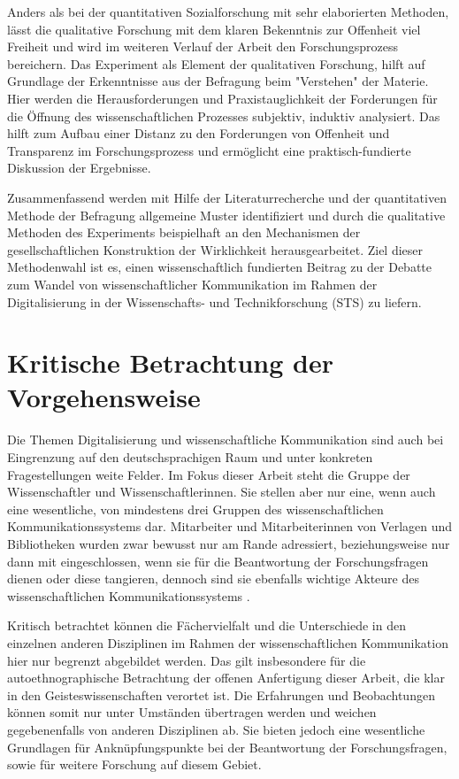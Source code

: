Anders als bei der quantitativen Sozialforschung mit sehr elaborierten Methoden,
lässt die qualitative Forschung mit dem klaren Bekenntnis zur Offenheit viel Freiheit und wird im weiteren Verlauf der Arbeit den Forschungsprozess bereichern. Das Experiment als Element der qualitativen Forschung, hilft auf Grundlage der Erkenntnisse aus der Befragung beim "Verstehen" der Materie. Hier werden die Herausforderungen und Praxistauglichkeit der Forderungen für die Öffnung des wissenschaftlichen Prozesses subjektiv, induktiv analysiert. Das hilft zum Aufbau einer Distanz zu den Forderungen von Offenheit und Transparenz im Forschungsprozess und ermöglicht eine praktisch-fundierte Diskussion der Ergebnisse.

Zusammenfassend werden mit Hilfe der Literaturrecherche und der quantitativen Methode der Befragung allgemeine Muster identifiziert und durch die qualitative Methoden des Experiments beispielhaft an den Mechanismen der gesellschaftlichen Konstruktion der Wirklichkeit herausgearbeitet. Ziel dieser Methodenwahl ist es, einen wissenschaftlich fundierten Beitrag zu der Debatte zum Wandel von wissenschaftlicher Kommunikation im Rahmen der Digitalisierung in der Wissenschafts- und Technikforschung (STS) zu liefern.

\section{Kritische Betrachtung der Vorgehensweise}

Die Themen Digitalisierung und wissenschaftliche Kommunikation sind auch bei Eingrenzung auf den deutschsprachigen Raum und unter konkreten Fragestellungen weite Felder. Im Fokus dieser Arbeit steht die Gruppe der Wissenschaftler und Wissenschaftlerinnen. Sie stellen aber nur eine, wenn auch eine wesentliche, von mindestens drei Gruppen des wissenschaftlichen Kommunikationssystems dar. Mitarbeiter und Mitarbeiterinnen von Verlagen und Bibliotheken wurden zwar bewusst nur am Rande adressiert, beziehungsweise nur dann mit eingeschlossen, wenn sie für die Beantwortung der Forschungsfragen dienen oder diese tangieren, dennoch sind sie ebenfalls wichtige Akteure des wissenschaftlichen Kommunikationssystems \cite{suchen}.

Kritisch betrachtet können die Fächervielfalt und die Unterschiede in den einzelnen anderen Disziplinen im Rahmen der wissenschaftlichen Kommunikation hier nur begrenzt abgebildet werden. Das gilt insbesondere für die autoethnographische Betrachtung der offenen Anfertigung dieser Arbeit, die klar in den Geisteswissenschaften verortet ist. Die Erfahrungen und Beobachtungen können somit nur unter Umständen übertragen werden und weichen gegebenenfalls von anderen Disziplinen ab. Sie bieten jedoch eine wesentliche Grundlagen für Anknüpfungspunkte bei der Beantwortung der Forschungsfragen, sowie für weitere Forschung auf diesem Gebiet.

